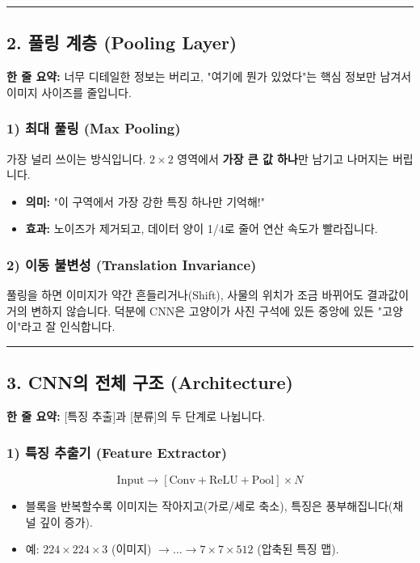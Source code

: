 \documentclass[11pt,a4paper]{book}
\theoremstyle{definition}
\begin{document}
\vspace{0.5cm}\hrule\vspace{0.5cm}

\subsection{2. 풀링 계층 (Pooling Layer)}


\begin{conceptbox}[title={개념 2: 요약 노트 만들기}]
\textbf{한 줄 요약:} 너무 디테일한 정보는 버리고, "여기에 뭔가 있었다"는 핵심 정보만 남겨서 이미지 사이즈를 줄입니다.
\end{conceptbox}

\subsubsection*{1) 최대 풀링 (Max Pooling)}
가장 널리 쓰이는 방식입니다. $2 \times 2$ 영역에서 \textbf{가장 큰 값 하나}만 남기고 나머지는 버립니다.
\begin{itemize}
    \item \textbf{의미:} "이 구역에서 가장 강한 특징 하나만 기억해!"
    \item \textbf{효과:} 노이즈가 제거되고, 데이터 양이 1/4로 줄어 연산 속도가 빨라집니다.
\end{itemize}

\subsubsection*{2) 이동 불변성 (Translation Invariance)}
풀링을 하면 이미지가 약간 흔들리거나(Shift), 사물의 위치가 조금 바뀌어도 결과값이 거의 변하지 않습니다. 덕분에 CNN은 고양이가 사진 구석에 있든 중앙에 있든 "고양이"라고 잘 인식합니다.

\vspace{0.5cm}\hrule\vspace{0.5cm}

\subsection{3. CNN의 전체 구조 (Architecture)}


\begin{conceptbox}[title={개념 3: 샌드위치 구조}]
\textbf{한 줄 요약:} [특징 추출]과 [분류]의 두 단계로 나뉩니다.
\end{conceptbox}

\subsubsection*{1) 특징 추출기 (Feature Extractor)}
$$ \text{Input} \to [\text{Conv} + \text{ReLU} + \text{Pool}] \times N $$
\begin{itemize}
    \item 블록을 반복할수록 이미지는 작아지고(가로/세로 축소), 특징은 풍부해집니다(채널 깊이 증가).
    \item 예: $224 \times 224 \times 3$ (이미지) $\to \dots \to 7 \times 7 \times 512$ (압축된 특징 맵).
\end{itemize}
\end{document}
